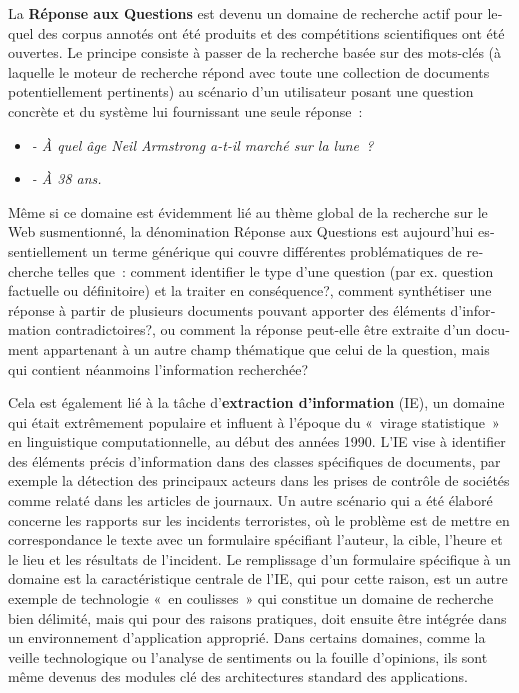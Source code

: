 \begin{french}
\begin{multicols}{2}
La {\bf Réponse aux Questions} est devenu un domaine de recherche actif pour
lequel des corpus annotés ont été produits et des compétitions
scientifiques ont été ouvertes. Le principe consiste à passer de la recherche
basée sur des mots-clés (à laquelle le moteur de recherche répond avec
toute une collection de documents potentiellement pertinents) au
scénario d'un utilisateur posant une question concrète et du système
lui fournissant une seule réponse~: 
\begin{itemize}
\item[] \textit{- À quel âge Neil Armstrong a-t-il marché sur la lune~?}
\item[] \textit{- À 38  ans.}
\end{itemize}
Même si ce domaine est évidemment lié au thème global de la recherche
sur le Web susmentionné, la dénomination Réponse aux Questions est
aujourd'hui essentiellement un terme générique qui couvre
différentes problématiques de recherche telles que~: comment
identifier le type d'une question (par ex. question factuelle ou
définitoire) et la traiter en conséquence?, comment synthétiser une
réponse à partir de plusieurs documents pouvant apporter des éléments
d'information contradictoires?, ou comment la réponse peut-elle être
extraite d'un document appartenant à un autre champ thématique que
celui de la question, mais qui contient néanmoins l'information
recherchée?

Cela est également lié à la tâche d'{\bf extraction d'information}
(IE), un domaine qui était extrêmement populaire et influent à
l'époque du «~virage statistique~» en linguistique computationnelle,
au début des années 1990. L'IE vise à identifier des éléments précis
d'information dans des classes spécifiques de documents, par exemple
la détection des principaux acteurs dans les prises de contrôle de
sociétés comme relaté dans les articles de journaux. Un autre scénario
qui a été élaboré concerne les rapports sur les incidents terroristes,
où le problème est de mettre en correspondance le texte avec un
formulaire spécifiant l'auteur, la cible, l'heure et le lieu et les
résultats de l'incident. Le remplissage d'un formulaire spécifique à
un domaine est la caractéristique centrale de l'IE, qui pour cette
raison, est un autre exemple de technologie «~en coulisses~» qui
constitue un domaine de recherche bien délimité, mais qui pour des
raisons pratiques, doit ensuite être intégrée dans un environnement
d'application approprié. Dans certains domaines, comme la veille technologique ou
l'analyse de sentiments ou la fouille d'opinions, ils sont même devenus des modules clé des
architectures standard des applications.


\end{multicols}
\end{french}
